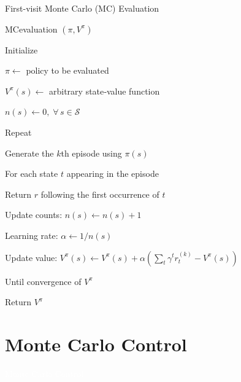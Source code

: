 \documentclass[11pt,table]{beamer}
\begin{document}
\begin{frame}{First-visit Monte Carlo (MC) Evaluation}


\begin{tcolorbox}[colframe=black, boxrule=1pt, sharp corners]

\textcolor{red1}{MCevaluation $\left(\pi, V^{\pi}\right)$}

\quad Initialize 

\qquad 
\(\pi \leftarrow\) policy to be evaluated

\qquad 
\(V^{\pi}(s) \leftarrow\) arbitrary state‐value function

\qquad 
\(n(s)\leftarrow 0,\;\forall\,s\in\mathcal{S}\)

\quad Repeat

\qquad Generate the $k$th episode using $\pi(s)$

\qquad For each state \(t\) appearing in the episode 

\qquad Return $r$ following the first occurrence of \(t\)

\qquad Update counts: $n(s) \leftarrow n(s)+1$

\qquad Learning rate: $\alpha \leftarrow 1 / n(s)$

\qquad Update value: $V^{\pi}(s) \leftarrow V^{\pi}(s)+\alpha\left(\sum_{t} \gamma^{t} r_{t}^{(k)}-V^{\pi}(s)\right)$

\quad Until convergence of $V^{\pi}$

\quad Return $V^{\pi}$


\end{tcolorbox}
    
\end{frame}

\section{Monte Carlo Control}
{
\begin{frame}
\centering
\Huge
\textcolor{white}{Monte Carlo Control}
\thispagestyle{empty}
\end{frame}
}
\end{document}
